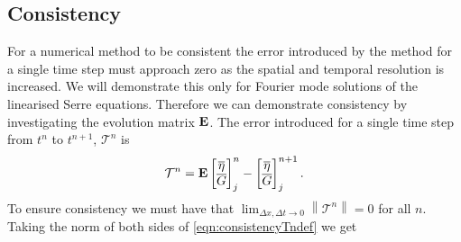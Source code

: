 



\subsection{Consistency}
For a numerical method to be consistent the error introduced by the method for a single time step must approach zero as the spatial and temporal resolution is increased. We will demonstrate this only for Fourier mode solutions of the linearised Serre equations. Therefore we can demonstrate consistency by investigating the evolution matrix $\mathbf{E}$. The error introduced for a single time step from $t^n$ to $t^{n+1}$, $\mathcal{T}^n$ is
\begin{equation}
\mathcal{T}^n =  \mathbf{E}\begin{bmatrix}
\overline{\eta} \\ \overline{G}
\end{bmatrix}^{n}_j -  \begin{bmatrix}
\overline{\eta} \\ \overline{G}
\end{bmatrix}^{n+1}_j.
\label{eqn:consistencyTndef}
\end{equation}
To ensure consistency we must have that $ \lim_{\Delta x,\Delta t \rightarrow 0}\left \| \mathcal{T}^n \right \| = 0 $ for all $n$. Taking the norm of both sides of \eqref{eqn:consistencyTndef} we get

